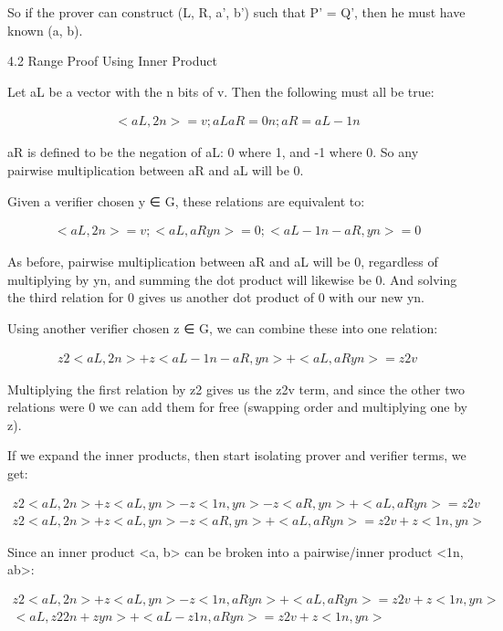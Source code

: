 \documentclass{article}
\begin{document}
So if the prover can construct (L, R, a’, b’) such that P’ = Q’, then he must have known (a, b).


4.2 Range Proof Using Inner Product

Let aL be a vector with the n bits of v.  Then the following must all be true:

\begin{eqnarray}
  <aL, 2n> = v ; aL aR = 0n ; aR = aL - 1n
\end{eqnarray}
  
aR is defined to be the negation of aL: 0 where 1, and -1 where 0.  So any pairwise multiplication between aR and aL will be 0.

Given a verifier chosen y ∈ G, these relations are equivalent to:

\begin{eqnarray}
  <aL, 2n> = v ; <aL,  aRyn> = 0 ; <aL - 1n - aR, yn> = 0
\end{eqnarray}

As before, pairwise multiplication between aR and aL will be 0, regardless of multiplying by yn, and summing the dot product will likewise be 0. And solving the third relation for 0 gives us another dot product of 0 with our new yn.

Using another verifier chosen z ∈ G, we can combine these into one relation:

\begin{eqnarray}
  z2 <aL, 2n> + z <aL - 1n - aR, yn> + <aL,  aRyn> = z2 v
\end{eqnarray}

Multiplying the first relation by z2 gives us the z2v term, and since the other two relations were 0 we can add them for free (swapping order and multiplying one by z).

If we expand the inner products, then start isolating prover and verifier terms, we get:

\begin{eqnarray}
  z2 <aL, 2n> + z <aL, yn> - z <1n, yn> - z <aR, yn> + <aL,  aRyn> = z2 v\\
  z2 <aL, 2n> + z <aL, yn> - z <aR, yn> + <aL,  aRyn> = z2 v + z <1n, yn>
\end{eqnarray}

Since an inner product <a, b> can be broken into a pairwise/inner product <1n, ab>:

\begin{eqnarray}
  z2 <aL, 2n> + z <aL, yn> - z <1n, aRyn> + <aL,  aRyn> = z2 v + z <1n, yn>\\
  <aL, z2 2n + z yn> + <aL - z 1n, aRyn> = z2 v + z <1n, yn>
\end{eqnarray}
\end{document}
